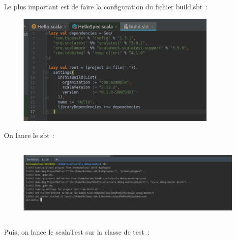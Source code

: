 \documentclass[12pt]{article}
\begin{document}
Le plus important est de faire la configuration du fichier build.sbt :\par




\begin{figure}[H]
	\begin{Center}
		\includegraphics[width=3.88in,height=2.17in]{./media/image17.png}
	\end{Center}
\end{figure}



\par

On lance le sbt :\par




\begin{figure}[H]
	\begin{Center}
		\includegraphics[width=5.63in,height=1.5in]{./media/image18.png}
	\end{Center}
\end{figure}



\par

Puis, on lance le scalaTest sur la classe de test :\par
\end{document}
